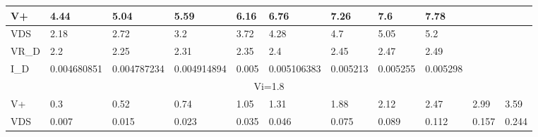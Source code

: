 \begin{table}[h]
{\begin{tabular}{|lllllllllll|}
\multicolumn{1}{|l|}{V+}    & \multicolumn{1}{l|}{4.44}        & \multicolumn{1}{l|}{5.04}        & \multicolumn{1}{l|}{5.59}        & \multicolumn{1}{l|}{6.16}        & \multicolumn{1}{l|}{6.76}        & \multicolumn{1}{l|}{7.26}     & \multicolumn{1}{l|}{7.6}      & \multicolumn{1}{l|}{7.78}     & \multicolumn{1}{l|}{}         &          \\ \hline
\multicolumn{1}{|l|}{VDS}   & \multicolumn{1}{l|}{2.18}        & \multicolumn{1}{l|}{2.72}        & \multicolumn{1}{l|}{3.2}         & \multicolumn{1}{l|}{3.72}        & \multicolumn{1}{l|}{4.28}        & \multicolumn{1}{l|}{4.7}      & \multicolumn{1}{l|}{5.05}     & \multicolumn{1}{l|}{5.2}      & \multicolumn{1}{l|}{}         &          \\ \hline
\multicolumn{1}{|l|}{VR\_D} & \multicolumn{1}{l|}{2.2}         & \multicolumn{1}{l|}{2.25}        & \multicolumn{1}{l|}{2.31}        & \multicolumn{1}{l|}{2.35}        & \multicolumn{1}{l|}{2.4}         & \multicolumn{1}{l|}{2.45}     & \multicolumn{1}{l|}{2.47}     & \multicolumn{1}{l|}{2.49}     & \multicolumn{1}{l|}{}         &          \\ \hline
\multicolumn{1}{|l|}{I\_D}  & \multicolumn{1}{l|}{0.004680851} & \multicolumn{1}{l|}{0.004787234} & \multicolumn{1}{l|}{0.004914894} & \multicolumn{1}{l|}{0.005}       & \multicolumn{1}{l|}{0.005106383} & \multicolumn{1}{l|}{0.005213} & \multicolumn{1}{l|}{0.005255} & \multicolumn{1}{l|}{0.005298} & \multicolumn{1}{l|}{}         &          \\ \hline
\multicolumn{11}{|c|}{Vi=1.8}                                                                                                                                                                                                                                                                                                                         \\ \hline
\multicolumn{1}{|l|}{V+}    & \multicolumn{1}{l|}{0.3}         & \multicolumn{1}{l|}{0.52}        & \multicolumn{1}{l|}{0.74}        & \multicolumn{1}{l|}{1.05}        & \multicolumn{1}{l|}{1.31}        & \multicolumn{1}{l|}{1.88}     & \multicolumn{1}{l|}{2.12}     & \multicolumn{1}{l|}{2.47}     & \multicolumn{1}{l|}{2.99}     & 3.59     \\ \hline
\multicolumn{1}{|l|}{VDS}   & \multicolumn{1}{l|}{0.007}       & \multicolumn{1}{l|}{0.015}       & \multicolumn{1}{l|}{0.023}       & \multicolumn{1}{l|}{0.035}       & \multicolumn{1}{l|}{0.046}       & \multicolumn{1}{l|}{0.075}    & \multicolumn{1}{l|}{0.089}    & \multicolumn{1}{l|}{0.112}    & \multicolumn{1}{l|}{0.157}    & 0.244    \\ \hline

\end{tabular}}
\end{table}

